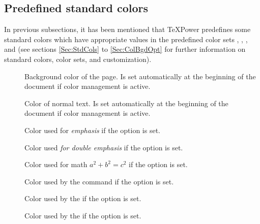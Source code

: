 \documentclass[12pt]{scrartcl}
\let\newslide=\relax
\begin{document}
  \subsection{Predefined standard colors}\label{Sec:Colors}
  In previous subsections, it has been mentioned that \TeX Power predefines some standard colors which have appropriate
  values in the predefined color sets , , , and  (see sections
  \ref{Sec:StdCols} to \ref{Sec:ColBgdOpt} for further information on standard colors, color sets, and customization).
  \begin{description}
  \item[]
    Background color of the page. Is set automatically at the beginning of the
    document if color management is active.

  \item[]
    Color of normal text. Is set automatically at the beginning of the
    document if color management is active.

  \item[]
    Color used for \emph{emphasis} if the  option is set.

  \item[]
    Color used \emph{for \emph{double} emphasis} if the  option
    is set.

  \item[]
    Color used for math $a^2+b^2=c^2$ if the  option is set.

  \item[]
    Color used by the  command if the 
    option is set.

  \item[]
    Color used by the  if the
     option is set.

  \item[]
    Color used by the  if the
     option is set.

    \newslide


\end{description}
\end{document}

